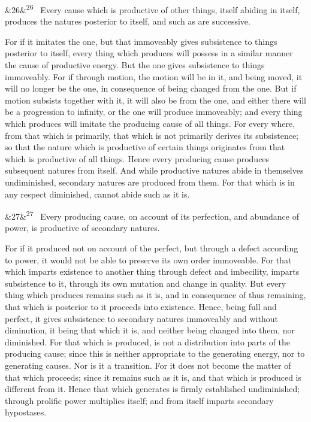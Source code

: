 \documentclass[12pt]{article}
\newcommand{\para}[1][]{\par\noindent\ifx&#1&\else\textsuperscript{\footnotesize #1}~\fi}
\begin{document}
\para[26] Every cause which is productive of other things, itself abiding in itself, produces the natures posterior to itself, and such as are successive.

For if it imitates the one, but that immoveably gives subsistence to things posterior to itself, every thing which produces will possess in a similar manner the cause of productive energy. But the one gives subsistence to things immoveably. For if through motion, the motion will be in it, and being moved, it will no longer be the one, in consequence of being changed from the one. But if motion subsists together with it, it will also be from the one, and either there will be a progression to infinity, or the one will produce immoveably; and every thing which produces will imitate the producing cause of all things. For every where, from that which is primarily, that which is not primarily derives its subsistence; so that the nature which is productive of certain things originates from that which is productive of all things. Hence every producing cause produces subsequent natures from itself. And while productive natures abide in themselves undiminished, secondary natures are produced from them. For that which is in any respect diminished, cannot abide such as it is.

\para[27] Every producing cause, on account of its perfection, and abundance of power, is productive of secondary natures.

For if it produced not on account of the perfect, but through a defect according to power, it would not be able to preserve its own order immoveable. For that which imparts existence to another thing through defect and imbecility, imparts subsistence to it, through its own mutation and change in quality. But every thing which produces remains such as it is, and in consequence of thus remaining, that which is posterior to it proceeds into existence. Hence, being full and perfect, it gives subsistence to secondary natures immoveably and without diminution, it being that which it is, and neither being changed into them, nor diminished. For that which is produced, is not a distribution into parts of the producing cause; since this is neither appropriate to the generating energy, nor to generating causes. Nor is it a transition. For it does not become the matter of that which proceeds; since it remains such as it is, and that which is produced is different from it. Hence that which generates is firmly established undiminished; through prolific power multiplies itself; and from itself imparts secondary hypostases.
\end{document}
